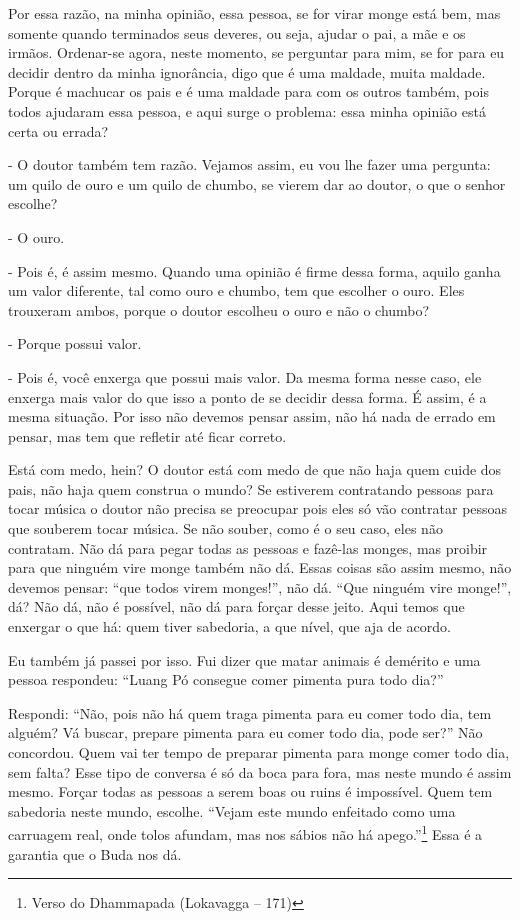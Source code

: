 Por essa razão, na minha opinião, essa pessoa, se for virar monge
está bem, mas somente quando terminados seus deveres, ou seja, ajudar o
pai, a mãe e os irmãos. Ordenar-se agora, neste momento, se perguntar
para mim, se for para eu decidir dentro da minha ignorância, digo que é
uma maldade, muita maldade. Porque é machucar os pais e é uma maldade
para com os outros também, pois todos ajudaram essa pessoa, e aqui
surge o problema: essa minha opinião está certa ou errada?

- O doutor também tem razão. Vejamos assim, eu vou lhe fazer uma
pergunta: um quilo de ouro e um quilo de chumbo, se vierem dar ao
doutor, o que o senhor escolhe? 

- O ouro.

- Pois é, é assim mesmo. Quando uma opinião é firme dessa forma,
aquilo ganha um valor diferente, tal como ouro e chumbo, tem que
escolher o ouro. Eles trouxeram ambos, porque o doutor escolheu o ouro
e não o chumbo?

- Porque possui valor.

- Pois é, você enxerga que possui mais valor. Da mesma forma nesse
caso, ele enxerga mais valor do que isso a ponto de se decidir dessa
forma. É assim, é a mesma situação. Por isso não devemos pensar assim,
não há nada de errado em pensar, mas tem que refletir até ficar
correto.

Está com medo, hein? O doutor está com medo de que não haja quem
cuide dos pais, não haja quem construa o mundo? Se estiverem
contratando pessoas para tocar música o doutor não precisa se preocupar
pois eles só vão contratar pessoas que souberem tocar música. Se não
souber, como é o seu caso, eles não contratam. Não dá para pegar todas
as pessoas e fazê-las monges, mas proibir para que ninguém vire monge
também não dá. Essas coisas são assim mesmo, não devemos pensar: “que
todos virem monges!”, não dá. “Que ninguém vire monge!”, dá? Não dá,
não é possível, não dá para forçar desse jeito. Aqui temos que enxergar
o que há: quem tiver sabedoria, a que nível, que aja de acordo.

Eu também já passei por isso. Fui dizer que matar animais é demérito
e uma pessoa respondeu: “Luang Pó consegue comer pimenta pura todo
dia?” 

Respondi: “Não, pois não há quem traga pimenta para eu comer todo
dia, tem alguém? Vá buscar, prepare pimenta para eu comer todo dia,
pode ser?” Não concordou. Quem vai ter tempo de preparar pimenta para
monge comer todo dia, sem falta? Esse tipo de conversa é só da boca
para fora, mas neste mundo é assim mesmo. Forçar todas as pessoas a
serem boas ou ruins é impossível. Quem tem sabedoria neste mundo,
escolhe. “Vejam este mundo enfeitado como uma carruagem real, onde
tolos afundam, mas nos sábios não há apego.”\footnote{Verso do
Dhammapada (Lokavagga – 171)} Essa é a garantia que o Buda nos dá. 

